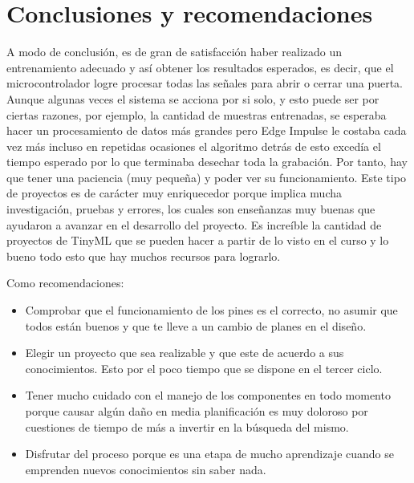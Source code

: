 \section{Conclusiones y recomendaciones}
A modo de conclusión, es de gran de satisfacción haber realizado un entrenamiento adecuado y así obtener los resultados esperados, es decir, que el microcontrolador logre procesar todas las señales para abrir o cerrar una puerta. Aunque algunas veces el sistema se acciona por si solo, y esto puede ser por ciertas razones, por ejemplo, la cantidad de muestras entrenadas, se esperaba hacer un procesamiento de datos más grandes pero Edge Impulse le costaba cada vez más incluso en repetidas ocasiones el algoritmo detrás de esto excedía el tiempo esperado por lo que terminaba desechar toda la grabación. Por tanto, hay que tener una paciencia (muy pequeña) y poder ver su funcionamiento. Este tipo de proyectos es de carácter muy enriquecedor porque implica mucha investigación, pruebas y errores, los cuales son enseñanzas muy buenas que ayudaron a avanzar en el desarrollo del proyecto. Es increíble la cantidad de proyectos de TinyML que se pueden hacer a partir de lo visto en el curso y lo bueno todo esto que hay muchos recursos para lograrlo.\par

Como recomendaciones:
\begin{itemize}

    \item Comprobar que el funcionamiento de los pines es el correcto, no asumir que todos están buenos y que te lleve a un cambio de planes en el diseño.
    \item Elegir un proyecto que sea realizable y que este de acuerdo a sus conocimientos. Esto por el poco tiempo que se dispone en el tercer ciclo.
    \item Tener mucho cuidado con el manejo de los componentes en todo momento porque causar algún daño en media planificación es muy doloroso por cuestiones de tiempo de más a invertir en la búsqueda del mismo.
    \item  Disfrutar del proceso porque es una etapa de mucho aprendizaje cuando se emprenden nuevos conocimientos sin saber nada.
\end{itemize}